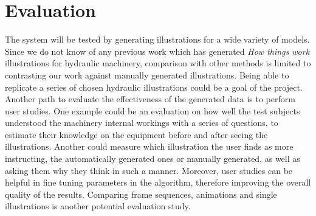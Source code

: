 \section{Evaluation}

The system will be tested by generating illustrations for a wide variety of models.
Since we do not know of any previous work which has generated \textit{How things work} illustrations for hydraulic machinery, comparison with other methods is limited to contrasting our work against manually generated illustrations.
Being able to replicate a series of chosen hydraulic illustrations could be a goal of the project. 
Another path to evaluate the effectiveness of the generated data is to perform user studies.
One example could be an evaluation on how well the test subjects understood the machinery internal workings with a series of questions, to estimate their knowledge on the equipment before and after seeing the illustrations.
Another could measure which illustration the user finds as more instructing, the automatically generated ones or manually generated, as well as asking them why they think in such a manner.
Moreover, user studies can be helpful in fine tuning parameters in the algorithm, therefore improving the overall quality of the results.
Comparing frame sequences, animations and single illustrations is another potential evaluation study.

